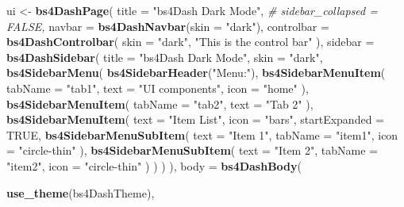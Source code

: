 \documentclass[
]{book}
\newenvironment{Shaded}{\begin{snugshade}}{\end{snugshade}}
\newcommand{\CommentTok}[1]{\textcolor[rgb]{0.56,0.35,0.01}{\textit{#1}}}
\newcommand{\DataTypeTok}[1]{\textcolor[rgb]{0.13,0.29,0.53}{#1}}
\newcommand{\KeywordTok}[1]{\textcolor[rgb]{0.13,0.29,0.53}{\textbf{#1}}}
\newcommand{\NormalTok}[1]{#1}
\newcommand{\OtherTok}[1]{\textcolor[rgb]{0.56,0.35,0.01}{#1}}
\newcommand{\StringTok}[1]{\textcolor[rgb]{0.31,0.60,0.02}{#1}}
\begin{document}
\begin{Shaded}
\begin{Highlighting}[]
\NormalTok{ui <-}\StringTok{ }\KeywordTok{bs4DashPage}\NormalTok{(}
  \DataTypeTok{title =} \StringTok{"bs4Dash Dark Mode"}\NormalTok{,}
  \CommentTok{# sidebar_collapsed = FALSE,}
  \DataTypeTok{navbar =} \KeywordTok{bs4DashNavbar}\NormalTok{(}\DataTypeTok{skin =} \StringTok{"dark"}\NormalTok{),}
  \DataTypeTok{controlbar =} \KeywordTok{bs4DashControlbar}\NormalTok{(}
    \DataTypeTok{skin =} \StringTok{"dark"}\NormalTok{,}
    \StringTok{"This is the control bar"}
\NormalTok{  ),}
  \DataTypeTok{sidebar =} \KeywordTok{bs4DashSidebar}\NormalTok{(}
    \DataTypeTok{title =} \StringTok{"bs4Dash Dark Mode"}\NormalTok{,}
    \DataTypeTok{skin =} \StringTok{"dark"}\NormalTok{,}
    \KeywordTok{bs4SidebarMenu}\NormalTok{(}
      \KeywordTok{bs4SidebarHeader}\NormalTok{(}\StringTok{"Menu:"}\NormalTok{),}
      \KeywordTok{bs4SidebarMenuItem}\NormalTok{(}
        \DataTypeTok{tabName =} \StringTok{"tab1"}\NormalTok{,}
        \DataTypeTok{text =} \StringTok{"UI components"}\NormalTok{,}
        \DataTypeTok{icon =} \StringTok{"home"}
\NormalTok{      ),}
      \KeywordTok{bs4SidebarMenuItem}\NormalTok{(}
        \DataTypeTok{tabName =} \StringTok{"tab2"}\NormalTok{,}
        \DataTypeTok{text =} \StringTok{"Tab 2"}
\NormalTok{      ),}
      \KeywordTok{bs4SidebarMenuItem}\NormalTok{(}
        \DataTypeTok{text =} \StringTok{"Item List"}\NormalTok{,}
        \DataTypeTok{icon =} \StringTok{"bars"}\NormalTok{,}
        \DataTypeTok{startExpanded =} \OtherTok{TRUE}\NormalTok{,}
        \KeywordTok{bs4SidebarMenuSubItem}\NormalTok{(}
          \DataTypeTok{text =} \StringTok{"Item 1"}\NormalTok{,}
          \DataTypeTok{tabName =} \StringTok{"item1"}\NormalTok{,}
          \DataTypeTok{icon =} \StringTok{"circle-thin"}
\NormalTok{        ),}
        \KeywordTok{bs4SidebarMenuSubItem}\NormalTok{(}
          \DataTypeTok{text =} \StringTok{"Item 2"}\NormalTok{,}
          \DataTypeTok{tabName =} \StringTok{"item2"}\NormalTok{,}
          \DataTypeTok{icon =} \StringTok{"circle-thin"}
\NormalTok{        )}
\NormalTok{      )}
\NormalTok{    )}
\NormalTok{  ),}
  \DataTypeTok{body =} \KeywordTok{bs4DashBody}\NormalTok{(}

    \KeywordTok{use_theme}\NormalTok{(bs4DashTheme),}


\end{Highlighting}
\end{Shaded}
\end{document}
